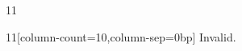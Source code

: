 \documentclass[paper=A4]{ropas-poster}
\begin{document}
\begin{postergrid}{1}{1}
\begin{posterblock}{1}{1}[column-count=10,column-sep=0bp]
Invalid.
\end{posterblock}
\end{postergrid}
\end{document}
